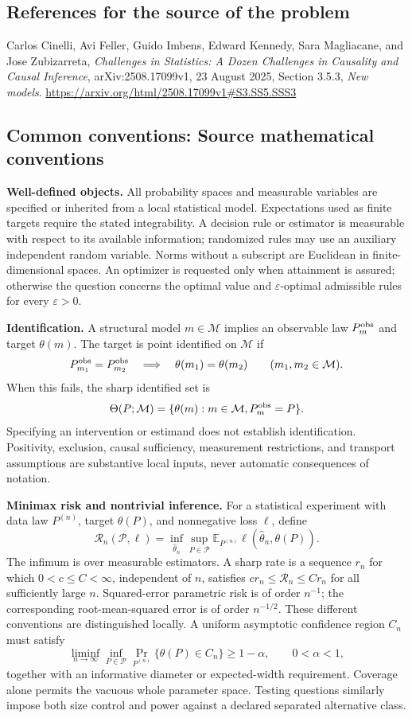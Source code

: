 \documentclass[11pt,a4paper]{article}
\newcommand{\E}{\mathbb E}
\begin{document}
\subsection*{References for the source of the problem}
Carlos Cinelli, Avi Feller, Guido Imbens, Edward Kennedy, Sara Magliacane, and Jose Zubizarreta, \emph{Challenges in Statistics: A Dozen Challenges in Causality and Causal Inference}, arXiv:2508.17099v1, 23 August 2025, Section 3.5.3, \emph{New models}.
\url{https://arxiv.org/html/2508.17099v1#S3.SS5.SSS3}

\subsection*{Common conventions: Source mathematical conventions}

\textbf{Well-defined objects.}
All probability spaces and measurable variables are specified or inherited
from a local statistical model. Expectations used as finite targets require
the stated integrability. A decision rule or estimator is measurable with
respect to its available information; randomized rules may use an auxiliary
independent random variable. Norms without a subscript are Euclidean in
finite-dimensional spaces. An optimizer is requested only when attainment
is assured; otherwise the question concerns the optimal value and
$\varepsilon$-optimal admissible rules for every $\varepsilon>0$.

\textbf{Identification.}
A structural model $m\in\mathcal M$ implies an observable law
$P_m^{\rm obs}$ and target $\theta(m)$. The target is point identified on
$\mathcal M$ if
\[
 P_{m_1}^{\rm obs}=P_{m_2}^{\rm obs}
 \quad\Longrightarrow\quad\theta(m_1)=\theta(m_2)
 \qquad(m_1,m_2\in\mathcal M).
\]
When this fails, the sharp identified set is
\[
 \Theta(P;\mathcal M)=\{\theta(m):m\in\mathcal M,
                                  P_m^{\rm obs}=P\}.
\]
Specifying an intervention or estimand does not establish identification.
Positivity, exclusion, causal sufficiency, measurement restrictions, and
transport assumptions are substantive local inputs, never automatic
consequences of notation.

\textbf{Minimax risk and nontrivial inference.}
For a statistical experiment with data law $P^{(n)}$, target $\theta(P)$,
and nonnegative loss $\ell$, define
\[
 \mathcal R_n(\mathcal P,\ell)
   =\inf_{\widehat\theta_n}\sup_{P\in\mathcal P}
      \E_{P^{(n)}}\ell(\widehat\theta_n,\theta(P)).
\]
The infimum is over measurable estimators. A sharp rate is a sequence
$r_n$ for which $0<c\leq C<\infty$, independent of $n$, satisfies
$c r_n\leq\mathcal R_n\leq C r_n$ for all sufficiently large $n$.
Squared-error parametric risk is of order $n^{-1}$; the corresponding
root-mean-squared error is of order $n^{-1/2}$. These different conventions
are distinguished locally. A uniform asymptotic confidence region $C_n$
must satisfy
\[
 \liminf_{n\to\infty}\inf_{P\in\mathcal P}
     \Pr_{P^{(n)}}\{\theta(P)\in C_n\}\geq 1-\alpha,
 \qquad 0<\alpha<1,
\]
together with an informative diameter or expected-width requirement.
Coverage alone permits the vacuous whole parameter space. Testing questions
similarly impose both size control and power against a declared separated
alternative class.
\end{document}
